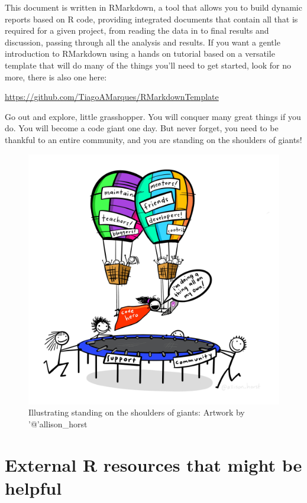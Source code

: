 \documentclass[
]{article}
\begin{document}
This document is written in RMarkdown, a tool that allows you to build
dynamic reports based on R code, providing integrated documents that
contain all that is required for a given project, from reading the data
in to final results and discussion, passing through all the analysis and
results. If you want a gentle introduction to RMarkdown using a hands on
tutorial based on a versatile template that will do many of the things
you'll need to get started, look for no more, there is also one here:

\url{https://github.com/TiagoAMarques/RMarkdownTemplate}

Go out and explore, little grasshopper. You will conquer many great
things if you do. You will become a code giant one day. But never
forget, you need to be thankful to an entire community, and you are
standing on the shoulders of giants!

\begin{figure}
\centering
\includegraphics{extfiles/code_hero.jpg}
\caption{Illustrating standing on the shoulders of giants: Artwork by
'@'allison\_horst}
\end{figure}

\hypertarget{external-r-resources-that-might-be-helpful}{%
\section{External R resources that might be
helpful}\label{external-r-resources-that-might-be-helpful}}
\end{document}
